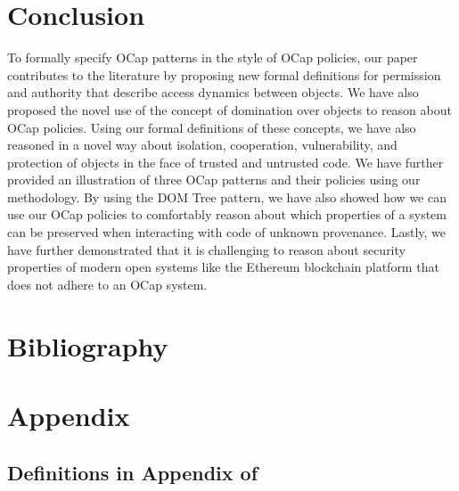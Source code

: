 \documentclass[a4paper,11pt,twoside]{article}
\begin{document}
{\section{Conclusion}
To formally specify OCap patterns in the style of OCap policies, our paper contributes to the literature by proposing new formal definitions for permission and authority that describe access dynamics between objects. We have also proposed the novel use of the concept of domination over objects to reason about OCap policies. Using our formal definitions of these concepts, we have also reasoned in a novel way about isolation, cooperation, vulnerability, and protection of objects in the face of trusted and untrusted code. We have further provided an illustration of three OCap patterns and their policies using our methodology. By using the DOM Tree pattern, we have also showed how we can use our OCap policies to comfortably reason about which properties of a system can be preserved when interacting with code of unknown provenance. Lastly, we have further demonstrated that it is challenging to reason about security properties of modern open systems like the Ethereum blockchain platform that does not adhere to an OCap system.

\small
\section{Bibliography}


\clearpage
\section{Appendix}
\subsection{Definitions in Appendix of \cite{drossopoulou2015b}}
}
\end{document}
